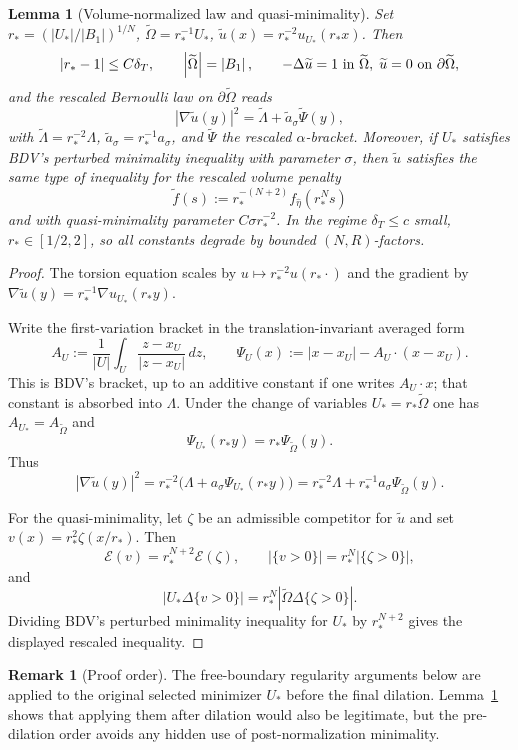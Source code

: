 \documentclass[11pt]{article}
\newtheorem{lemma}[theorem]{Lemma}
\theoremstyle{definition}
\newtheorem{remark}[theorem]{Remark}
\newcommand{\abs}[1]{\left|#1\right|}
\renewcommand{\d}{\,d}
\begin{document}
\begin{lemma}[Volume-normalized law and quasi-minimality]\label{lem:rescale}
Set $r_*=(\abs{U_*}/\abs{B_1})^{1/N}$, $\widetilde\Omega=r_*^{-1}U_*$,
$\widetilde u(x)=r_*^{-2}u_{U_*}(r_*x)$. Then
\[
\abs{r_*-1}\le C\delta_T,\qquad
\abs{\widetilde\Omega}=\abs{B_1},\qquad
-\Delta\widetilde u=1\hbox{ in }\widetilde\Omega,\;\widetilde u=0\hbox{ on }\partial\widetilde\Omega,
\]
and the rescaled Bernoulli law on $\partial\widetilde\Omega$ reads
\[
\abs{\nabla\widetilde u(y)}^2=\widetilde\Lambda+\widetilde a_\sigma\widetilde\Psi(y),
\]
with $\widetilde\Lambda=r_*^{-2}\Lambda$, $\widetilde a_\sigma=r_*^{-1}a_\sigma$,
and $\widetilde\Psi$ the rescaled $\alpha$-bracket. Moreover, if $U_*$
satisfies BDV's perturbed minimality inequality with parameter $\sigma$, then
$\widetilde u$ satisfies the same type of inequality for the rescaled volume
penalty
\[
\widetilde f(s):=r_*^{-(N+2)}f_{\hat\eta}(r_*^Ns)
\]
and with quasi-minimality parameter $C\sigma r_*^{-2}$. In the regime
$\delta_T\le c$ small, $r_*\in[1/2,2]$, so all constants degrade by bounded
$(N,R)$-factors.
\end{lemma}

\begin{proof}
The torsion equation scales by $u\mapsto r_*^{-2}u(r_*\cdot)$ and the gradient
by $\nabla\widetilde u(y)=r_*^{-1}\nabla u_{U_*}(r_*y)$.

Write the first-variation bracket in the translation-invariant averaged form
\[
A_U:=\frac1{\abs U}\int_U\frac{z-x_U}{\abs{z-x_U}}\d z,\qquad
\Psi_U(x):=\abs{x-x_U}-A_U\cdot(x-x_U).
\]
This is BDV's bracket, up to an additive constant if one writes $A_U\cdot x$;
that constant is absorbed into $\Lambda$. Under the change of variables
$U_*=r_*\widetilde\Omega$ one has $A_{U_*}=A_{\widetilde\Omega}$ and
\[
\Psi_{U_*}(r_*y)=r_*\Psi_{\widetilde\Omega}(y).
\]
Thus
\[
\abs{\nabla\widetilde u(y)}^2
=r_*^{-2}\bigl(\Lambda+a_\sigma\Psi_{U_*}(r_*y)\bigr)
=r_*^{-2}\Lambda+r_*^{-1}a_\sigma\Psi_{\widetilde\Omega}(y).
\]

For the quasi-minimality, let $\zeta$ be an admissible competitor for
$\widetilde u$ and set $v(x)=r_*^2\zeta(x/r_*)$. Then
\[
\mathcal E(v)=r_*^{N+2}\mathcal E(\zeta),\qquad
\abs{\{v>0\}}=r_*^N\abs{\{\zeta>0\}},
\]
and
\[
\abs{U_*\Delta\{v>0\}}=r_*^N
\abs{\widetilde\Omega\Delta\{\zeta>0\}}.
\]
Dividing BDV's perturbed minimality inequality for $U_*$ by $r_*^{N+2}$
gives the displayed rescaled inequality.
\end{proof}

\begin{remark}[Proof order]
The free-boundary regularity arguments below are applied to the original
selected minimizer $U_*$ before the final dilation. Lemma~\ref{lem:rescale}
shows that applying them after dilation would also be legitimate, but the
pre-dilation order avoids any hidden use of post-normalization minimality.
\end{remark}
\end{document}
